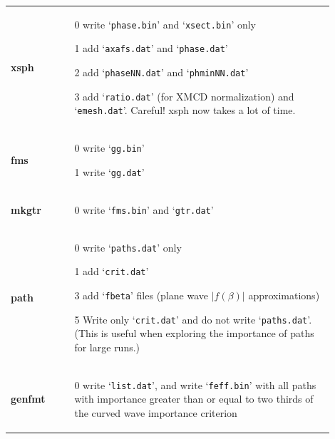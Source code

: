 \documentclass[11pt,oneside]{report} %
\newcommand{\file}[1]{`\texttt{#1}'}
\newcommand{\module}[1]{\textrm{\bf{#1}}}
\begin{document}
\begin{latexonly}
\begin{table}[htbp]
\begin{center}
\begin{tabular}[h]{p{0.1\linewidth}p{0.8\linewidth}}
      \module{xsph} &
      \vspace{-4ex}
      \begin{itemize}
        \tightlist
      \item[0] write \file{phase.bin} and \file{xsect.bin} only
      \item[1] add \file{axafs.dat} and \file{phase.dat}
      \item[2] add \file{phaseNN.dat} and \file{phminNN.dat}
      \item[3] add \file{ratio.dat} (for XMCD normalization) and \file{emesh.dat}.  Careful!  xsph now takes a lot of time.
      \end{itemize} \\
      \module{fms} &
      \vspace{-4ex}
      \begin{itemize}
        \tightlist
      \item[0] write \file{gg.bin}
      \item[1] write \file{gg.dat}
      \end{itemize}\\
      \module{mkgtr} &
      \vspace{-4ex}
      \begin{itemize}
        \tightlist
      \item[0] write \file{fms.bin} and \file{gtr.dat}
      \end{itemize}\\
      \module{path} &
      \vspace{-4ex}
      \begin{itemize}
        \tightlist
      \item[0] write \file{paths.dat} only
      \item[1] add \file{crit.dat}
      \item[3] add \file{fbeta} files (plane wave $|f(\beta)|$ approximations)
      \item[5] Write only \file{crit.dat} and do not write \file{paths.dat}.
        (This is useful when exploring the importance of paths for large runs.)
      \end{itemize}\\
      \module{genfmt} &
      \vspace{-4ex}
      \begin{itemize}
        \tightlist
      \item[0] write \file{list.dat}, and write \file{feff.bin} with all paths with importance greater than or equal to two thirds of the curved wave importance criterion

\end{itemize}
\end{tabular}
\end{center}
\end{table}
\end{latexonly}
\end{document}
